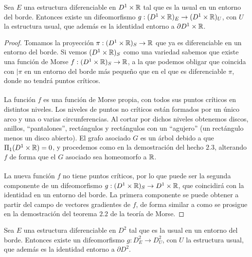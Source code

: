 \begin{hecho}
	Sea $E$ una estructura diferenciable en $D^1 \times \mathbb{R}$ tal que es la usual en un entorno del borde. Entonces existe un difeomorfismo $g:(D^1 \times \mathbb{R})_E \rightarrow (D^1 \times \mathbb{R})_U$, con $U$ la estructura usual, que además es la identidad entorno a $\partial D^1 \times \mathbb{R}$.
\end{hecho}

\begin{proof}
	Tomamos la proyección $\pi : (D^1 \times \mathbb{R})_S \rightarrow \mathbb{R}$ que ya es diferenciable en un entorno del borde. Si vemos $(D^1 \times \mathbb{R})_{S}$ como una variedad sabemos que existe una  función de Morse $f : (D^1 \times \mathbb{R})_S \rightarrow \mathbb{R}$, a la que podemos obligar que coincida con $|\pi$ en un entorno del borde más pequeño que en el que es diferenciable $\pi$, donde no tendrá puntos críticos. \\
	\\ La función $f$ es una función de Morse propia, con todos sus puntos críticos en distintos niveles. Los niveles de puntos no críticos están formados por un único arco y una o varias circunferencias. Al cortar por dichos niveles obtenemos discos, anillos, ``pantalones'', rectángulos y rectángulos con un ``agujero'' (un rectángulo menos un disco abierto). El grafo asociado $G$ es un árbol debido a que $\Pi_1(D^1 \times \mathbb{R}) = 0$, y procedemos como en la demostración del hecho $2.3$, alterando $f$ de forma que el $G$ asociado sea homeomorfo a $\mathbb{R}$. \\
	\\ La nueva función $f$ no tiene puntos críticos, por lo que puede ser la segunda componente de un difeomorfismo $g:(D^1 \times \mathbb{R})_S \rightarrow D^1 \times \mathbb{R}$, que coincidirá con la identidad en un entorno del borde. La primera componente se puede obtener a partir del campo de vectores gradientes de $f$, de forma similar a como se prosigue en la demostración del teorema $2.2$ de la teoría de Morse.
\end{proof}

\begin{hecho}
	Sea $E$ una estructura diferenciable en $D^2$ tal que es la usual en un entorno del borde. Entonces existe un difeomorfismo $g:D^2_E \rightarrow D^2_U$, con $U$ la estructura usual, que además es la identidad entorno a $\partial D^2$.
\end{hecho}

